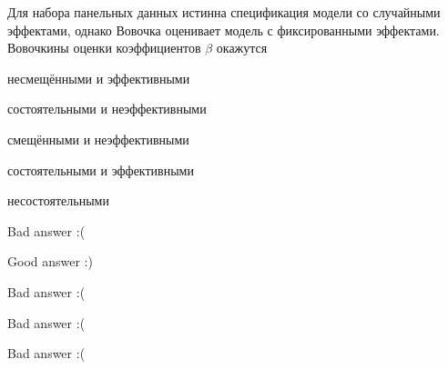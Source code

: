 
\begin{question}
Для набора панельных данных истинна спецификация модели со случайными эффектами, однако Вовочка оценивает модель с фиксированными эффектами. Вовочкины оценки коэффициентов \(\beta\) окажутся
\begin{answerlist}
  \item несмещёнными и эффективными
  \item состоятельными и неэффективными
  \item смещёнными и неэффективными
  \item состоятельными и эффективными
  \item несостоятельными
\end{answerlist}
\end{question}

\begin{solution}
\begin{answerlist}
  \item Bad answer :(
  \item Good answer :)
  \item Bad answer :(
  \item Bad answer :(
  \item Bad answer :(
\end{answerlist}
\end{solution}

